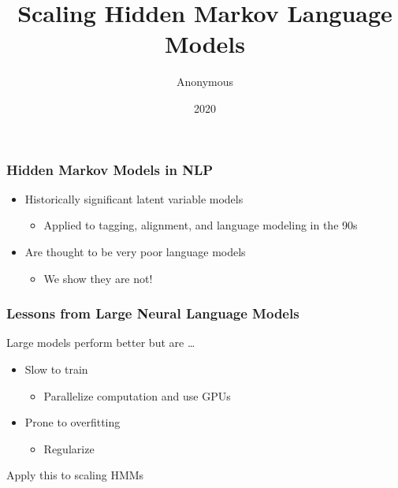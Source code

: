 \documentclass{beamer}
\title{Scaling Hidden Markov Language Models}
\author{Anonymous}
\date{2020}
\begin{document}
\frame{\titlepage}

\begin{frame}
\frametitle{Hidden Markov Models in NLP}
\begin{itemize}
\item Historically significant latent variable models
    \begin{itemize}
    \item Applied to tagging, alignment, and language modeling in the 90s
    \end{itemize}
\item Are thought to be very poor language models
    \begin{itemize}
    \item We show they are not!
    \end{itemize}
\end{itemize}
\end{frame}

\begin{frame}
\frametitle{Lessons from Large Neural Language Models}

Large models perform better but are \ldots

\begin{itemize}
\item Slow to train
    \begin{itemize}
    \item Parallelize computation and use GPUs
    \end{itemize}
\item Prone to overfitting
    \begin{itemize}
    \item Regularize
    \end{itemize}
\end{itemize}

Apply this to scaling HMMs
\end{frame}
\end{document}
